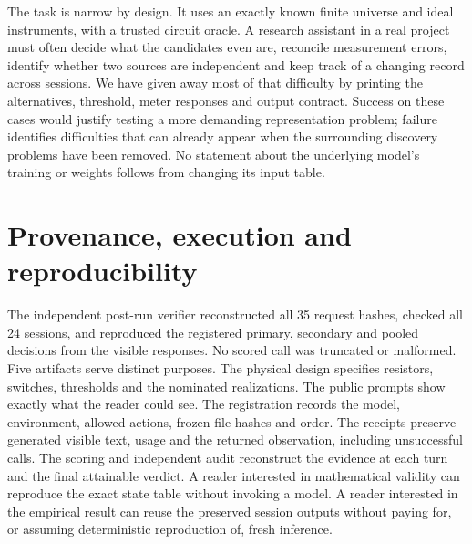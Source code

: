 \documentclass[12pt,letterpaper]{article}
\begin{document}
The task is narrow by design. It uses an exactly known finite universe and ideal instruments, with a trusted circuit oracle. A research assistant in a real project must often decide what the candidates even are, reconcile measurement errors, identify whether two sources are independent and keep track of a changing record across sessions. We have given away most of that difficulty by printing the alternatives, threshold, meter responses and output contract. Success on these cases would justify testing a more demanding representation problem; failure identifies difficulties that can already appear when the surrounding discovery problems have been removed. No statement about the underlying model's training or weights follows from changing its input table.

\section{Provenance, execution and reproducibility}

The independent post-run verifier reconstructed all 35 request hashes, checked all 24 sessions, and reproduced the registered primary, secondary and pooled decisions from the visible responses. No scored call was truncated or malformed. Five artifacts serve distinct purposes. The physical design specifies resistors, switches, thresholds and the nominated realizations. The public prompts show exactly what the reader could see. The registration records the model, environment, allowed actions, frozen file hashes and order. The receipts preserve generated visible text, usage and the returned observation, including unsuccessful calls. The scoring and independent audit reconstruct the evidence at each turn and the final attainable verdict. A reader interested in mathematical validity can reproduce the exact state table without invoking a model. A reader interested in the empirical result can reuse the preserved session outputs without paying for, or assuming deterministic reproduction of, fresh inference.
\end{document}
